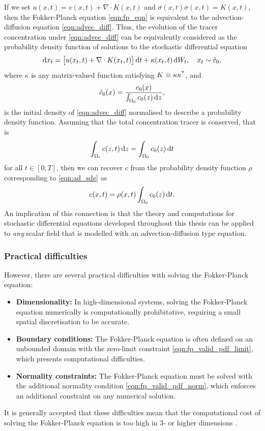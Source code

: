 If we set \(u\!\left(x,t\right) = v\!\left(x,t\right) + \nabla \cdot K\!\left(x,t\right)\) and \(\sigma\!\left(x,t\right)\sigma\!\left(x,t\right) = K\!\left(x,t\right)\), then the Fokker-Planck equation \cref{eqn:fp_eqn} is equivalent to the advection-diffusion equation \cref{eqn:advec_diff}.
Thus, the evolution of the tracer concentration under \cref{eqn:advec_diff} can be equivalently considered as the probability density function of solutions to the stochastic differential equation
\begin{equation}\label{eqn:ad_sde}
	\dif x_t = \left[u\!\left(x_t, t\right) + \nabla \cdot K\!\left(x_t, t\right)\right]\dif t + \kappa\!\left(x_t, t\right)\dif W_t, \quad x_t \sim \hat{c}_0,
\end{equation}
where \(\kappa\) is any matrix-valued function satisfying \(K \equiv \kappa\kappa^{^{\intercal}}\), and
\[
	\hat{c}_0\!\left(x\right) = \frac{c_0\!\left(x\right)}{\int_{\Omega_0}c_0\!\left(z\right)\dif z},
\]
is the initial density of \cref{eqn:advec_diff} normalised to describe a probability density function.
Assuming that the total concentration tracer is conserved, that is
\[
	\int_{\Omega_t}{c\!\left(z,t\right)\dif z} = \int_{\Omega_0}{c_0\!\left(z\right)\dif t}
\]
for all \(t \in [0,T]\), then we can recover \(c\) from the probability density function \(\rho\) corresponding to \cref{eqn:ad_sde} as
\[
	c\!\left(x,t\right) = \rho\!\left(x,t\right)\int_{\Omega_0}{c_0\!\left(z\right)\dif t}.
\]
An implication of this connection is that the theory and computations for stochastic differential equations developed throughout this thesis can be applied to \emph{any} scalar field that is modelled with an advection-diffusion type equation.



\subsubsection{Practical difficulties}

However, there are several practical difficulties with solving the Fokker-Planck equation:
\begin{itemize}
	\item \textbf{Dimensionality:} In high-dimensional systems, solving the Fokker-Planck equation numerically is computationally prohibitative, requiring a small spatial discretisation to be accurate.
	\item \textbf{Boundary conditions:} The Fokker-Planck equation is often defined on an unbounded domain with the zero-limit constraint \cref{eqn:fp_valid_pdf_limit}, which presents computational difficulties.
	\item \textbf{Normality constraints:} The Fokker-Planck equation must be solved with the additional normality condition \cref{eqn:fp_valid_pdf_norm}, which enforces an additional constraint on any numerical solution.
\end{itemize}
It is generally accepted that these difficulties mean that the computational cost of solving the Fokker-Planck equation is too high in \(3\)- or higher dimensions \citep{ZhaiEtAl_2022_DeepLearningMethod,Li_2019_DatadrivenMethodSteady,AllawalaMarston_2016_StatisticsStochasticallyForced}.




